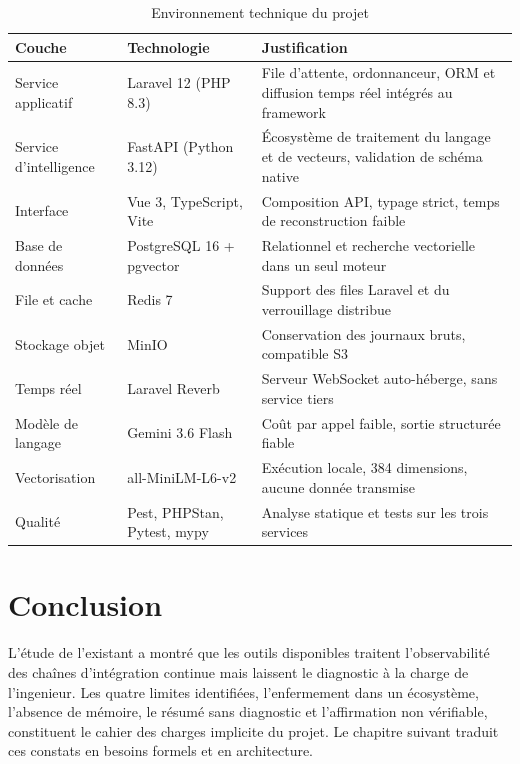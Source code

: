 \documentclass[12pt,a4paper,oneside]{report}
\begin{document}
\begin{table}[htbp]
\centering
\caption{Environnement technique du projet}
\label{tab:outils}
\small
\begin{tabularx}{\textwidth}{@{}llX@{}}
\toprule
\textbf{Couche} & \textbf{Technologie} & \textbf{Justification} \\
\midrule
Service applicatif & Laravel 12 (PHP 8.3) & File d'attente, ordonnanceur, ORM et diffusion temps réel intégrés au framework \\
Service d'intelligence & FastAPI (Python 3.12) & Écosystème de traitement du langage et de vecteurs, validation de schéma native \\
Interface & Vue 3, TypeScript, Vite & Composition API, typage strict, temps de reconstruction faible \\
Base de données & PostgreSQL 16 + pgvector & Relationnel et recherche vectorielle dans un seul moteur \\
File et cache & Redis 7 & Support des files Laravel et du verrouillage distribue \\
Stockage objet & MinIO & Conservation des journaux bruts, compatible S3 \\
Temps réel & Laravel Reverb & Serveur WebSocket auto-héberge, sans service tiers \\
Modèle de langage & Gemini 3.6 Flash & Coût par appel faible, sortie structurée fiable \\
Vectorisation & all-MiniLM-L6-v2 & Exécution locale, 384 dimensions, aucune donnée transmise \\
Qualité & Pest, PHPStan, Pytest, mypy & Analyse statique et tests sur les trois services \\
\bottomrule
\end{tabularx}
\end{table}

\section*{Conclusion}

L'étude de l'existant a montré que les outils disponibles traitent l'observabilité
des chaînes d'intégration continue mais laissent le diagnostic à la charge de
l'ingenieur. Les quatre limites identifiées, l'enfermement dans un écosystème,
l'absence de mémoire, le résumé sans diagnostic et l'affirmation non vérifiable,
constituent le cahier des charges implicite du projet. Le chapitre suivant traduit
ces constats en besoins formels et en architecture.
\end{document}
